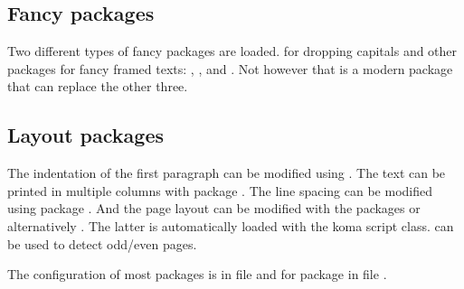 
\subsection{Fancy packages}
\label{sec:packages:fancy}

Two different types of fancy packages are loaded.  for dropping capitals and other packages for fancy framed texts: , ,  and . Not however that  is a modern package that can replace the other three.



\subsection{Layout packages}
\label{sec:packages:layout}

The indentation of the first paragraph can be modified using . The text can be printed in multiple columns with package . The line spacing can be modified using package 
. And the page layout can be modified with the packages  or alternatively . The latter is automatically loaded with the koma script class.  can be used to detect odd/even pages.

The configuration of most packages is in file  and 
for package  in file .



